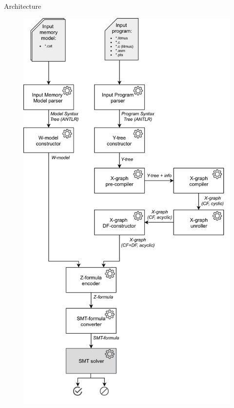 \documentclass{beamer}
\begin{document}
\begin{frame}{Architecture}%
\vspace{-30pt}
\begin{figure}
  \centering
  \includegraphics[height=.99\textheight,keepaspectratio]{../img/my/draw.io/general_arch-no_numbering.png} %
\end{figure}
\end{frame}
\end{document}
